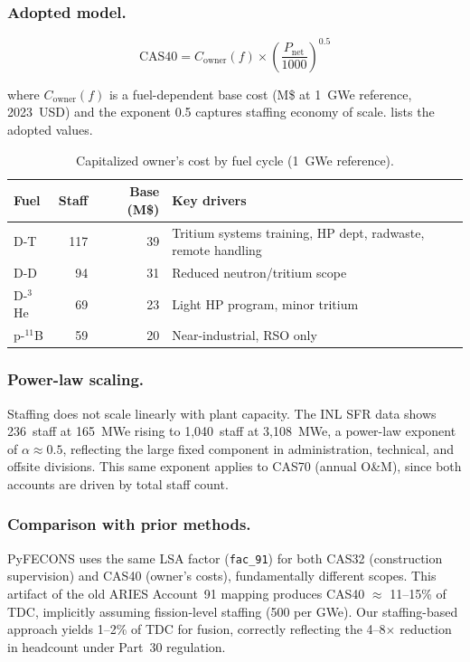 \documentclass{article}
\begin{document}
\subsubsection{Adopted model.}
\begin{equation}
\label{eq:cas40}
\text{CAS40} = C_{\text{owner}}(f) \times
               \left(\frac{P_{\text{net}}}{1000}\right)^{0.5}
\end{equation}

\noindent where $C_{\text{owner}}(f)$ is a fuel-dependent base cost
(M\$ at 1~GWe reference, 2023~USD) and the exponent 0.5 captures
staffing economy of scale.  lists the adopted
values.

\begin{table}[htbp]
\caption{Capitalized owner's cost by fuel cycle (1~GWe reference).}
\label{tab:cas40-fuel}
\centering
\begin{tabular}{lrrl}
\toprule
Fuel & Staff & Base (M\$) & Key drivers \\
\midrule
D-T          & 117 & 39 & Tritium systems training, HP dept, radwaste, remote handling \\
D-D          &  94 & 31 & Reduced neutron/tritium scope \\
D-${}^3$He   &  69 & 23 & Light HP program, minor tritium \\
p-${}^{11}$B &  59 & 20 & Near-industrial, RSO only \\
\bottomrule
\end{tabular}
\end{table}

\subsubsection{Power-law scaling.}
Staffing does not scale linearly with plant capacity. The INL SFR
data \citep{prosser2024} shows 236~staff at 165~MWe rising to
1{,}040~staff at 3{,}108~MWe, a power-law exponent of
$\alpha \approx 0.5$, reflecting the large fixed component in
administration, technical, and offsite divisions. This same exponent
applies to CAS70 (annual O\&M), since both accounts are driven by
total staff count.

\subsubsection{Comparison with prior methods.}
PyFECONS uses the same LSA factor (\texttt{fac\_91}) for both CAS32
(construction supervision) and CAS40 (owner's costs), fundamentally
different scopes. This artifact of the old ARIES Account~91 mapping
produces CAS40 $\approx$ 11--15\% of TDC, implicitly assuming
fission-level staffing (500 per GWe). Our staffing-based
approach yields 1--2\% of TDC for fusion, correctly reflecting the
4--8$\times$ reduction in headcount under Part~30 regulation.
\end{document}

